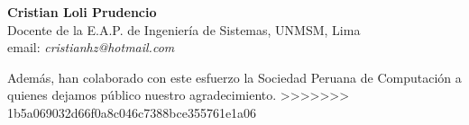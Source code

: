 \begin{center}
\textbf{Cristian Loli Prudencio}\\
Docente de la E.A.P. de Ingenierí­a de Sistemas, UNMSM, Lima\\ 
email: \textit{cristianhz@hotmail.com}\\
\end{center}

Además, han colaborado con este esfuerzo la Sociedad Peruana de Computación a quienes dejamos público nuestro agradecimiento.
>>>>>>> 1b5a069032d66f0a8c046c7388bce355761e1a06

